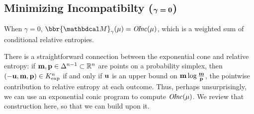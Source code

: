\documentclass[twoside]{article}
\newcommand\discard[1]{}
\newcommand\voli[1]{{\color{olicolor}\textbf{$\boldsymbol\{$Oli: }#1 \textbf{$\boldsymbol\}$}}}
\begin{document}

\subsection{%
    Minimizing Incompatibilty
    (\texorpdfstring{$\boldsymbol\gamma\boldsymbol=\mathbf{0}$}{gamma=0})%
} \label{sec:minimize-inc}

When $\gamma = 0$, $\bbr{\dg M}_\gamma(\mu)= \OInc(\mu)$, which is a
weighted sum of conditional relative entropies.
\discard{\voli{
    Unsurprisingly, exponential (``relative entropy'') cone constraints 
    can find such minima in a standard way.}}
There is a straightforward connection between the exponential cone and
relative entropy:
if $\mathbf{m}, \mathbf{p} \in \Delta^{n-1} \subset \mathbb R^n$ are points on
a probability simplex,
then $(-\mathbf{u}, \mathbf{m}, \mathbf{p}) \in K_{\exp}^n$ if and only if
$\mathbf{u}$ is an upper bound on $\mathbf{m} \log \frac{\mathbf{m}}{\mathbf{p}}$,
the pointwise contribution to relative entropy at each outcome.
Thus, perhaps unsurprisingly, we can use an exponential conic program
to compute $\mathit{O\mskip-2.5muI\mskip-3.5mun\mskip-1.7muc}(\mu)$. 
We review that construction here,
so that we can build upon it.
\end{document}
